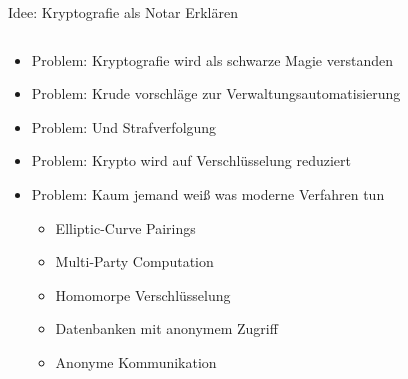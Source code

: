 \documentclass{rosenpass-beamer}
\begin{document}
\begin{frame}{Idee: Kryptografie als Notar Erklären}
\begin{columns}[c]

\begin{column}{0.7\textwidth}
  \begin{itemize}
    \item Problem: Kryptografie wird als schwarze Magie verstanden
    \item Problem: Krude vorschläge zur Verwaltungsautomatisierung
    \item Problem: Und Strafverfolgung
    \item Problem: Krypto wird auf Verschlüsselung reduziert
    \item
      Problem: Kaum jemand weiß was moderne Verfahren tun
      \begin{itemize}
        \item Elliptic-Curve Pairings
        \item Multi-Party Computation
        \item Homomorpe Verschlüsselung
        \item Datenbanken mit anonymem Zugriff
        \item Anonyme Kommunikation
      \end{itemize}
  \end{itemize}
\end{column}


\end{columns}
\end{frame}
\end{document}
